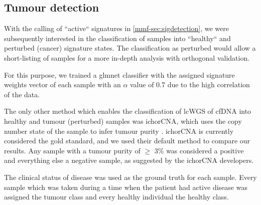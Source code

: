 \subsection{Tumour detection}
\label{mmf-sec:tumourdetection}

With the calling of ``active`` signatures in \autoref{mmf-sec:sigdetection}, we were subsequently interested in the classification of samples into ``healthy`` and perturbed (cancer) signature states. The classification as perturbed would allow a short-listing of samples for a more in-depth analysis with orthogonal validation.

For this purpose, we trained a glmnet classifier with the assigned signature weights vector of each sample with an $\alpha$ value of 0.7 due to the high correlation of the data.

The only other method which enables the classification of lcWGS of cfDNA into healthy and tumour (perturbed) samples was ichorCNA, which uses the copy number state of the sample to infer tumour purity  \cite{Adalsteinsson2017}. ichorCNA is currently considered the gold standard, and we used their default method  to compare our results. Any sample with a tumour purity of $\geq$ 3\% was considered a positive and everything else a negative sample, as suggested by the ichorCNA developers.

The clinical status of disease was used as the ground truth for each sample. Every sample which was taken during a time when the patient had active disease was assigned the tumour class and every healthy individual the healthy class.
